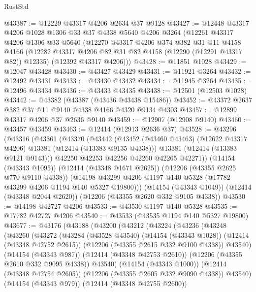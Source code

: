 \begin{lexlean}{RustStd}
\begin{coremodule}
@43387 := @12229 @43317 @4206 @2634 @37 @9128
@43427 := @12448
    @43317
    @4206
    @1028
    @1306
    @33
    @37
    @4338
    @5640
    @4206
    @3264
    (@12261
      @43317
      @4206
      @1306
      @33
      @5640
      (@12270
        @43317
        @4206
        @374
        @382
        @31
        @11
        @4158
        @4166
        (@12282 @43317 @4206 @82 @31 @82 @4158 (@12290 (@12291 @43317 @82)) @12335)
        (@12392 @43317 @4206)))
@43428 := @11851 @1028
@43429 := @12047 @43428
@43430 := @43427 @43429
@43431 := @11921 @3264
@43432 := @12492 @43431
@43433 := @43430 @43432
@43434 := @11945 @3264
@43435 := @12496 @43434
@43436 := @43433 @43435
@43438 := @12501 (@12503 @1028)
@43442 := @43382 (@43387 (@43436 @43438 @15486))
@43452 := @43372 @2637 @382 @37 @11 @9140 @4338 @4166 @4320 @9134 @4303
@43457 := @12899 @43317 @4206 @37 @2636 @9140
@43459 := @12907 (@12908 @9140)
@43460 := @43457 @43459
@43463 := @12414 (@12913 @2636 @37)
@43528 := @43296
    (@43316
      (@43361
        (@43370
          (@43442
            (@43452 (@43460 @43463) (@12622 @43317 @4206) @13381 (@12414 (@13383 @9135 @4338)))
            @13381
            (@12414 (@13383 @9121 @9143)))
          @42250
          @42253
          @42256
          @42260
          @42265
          @42271))
      (@14154 (@43343 @1095))
      (@12414 (@43348 @1671 @2625))
      (@12206 (@43355 @2625 @770 @9110 @4338))
      (@14198 @43299 @4206 @1197 @140 @5328 (@17782 @43299 @4206 @1194 @140 @5327 @19800)))
    (@14154 (@43343 @1049))
    (@12414 (@43348 @2044 @2620))
    (@12206 (@43355 @2620 @332 @9105 @4338))
@43530 := @14198 @42727 @4206
@43533 := @43530 @1197 @140 @5328
@43535 := @17782 @42727 @4206
@43540 := @43533 (@43535 @1194 @140 @5327 @19800)
@43677 := @43176
    (@43188
      (@43200
        (@43212
          (@43224
            (@43236
              (@43248
                (@43260
                  (@43272
                    (@43284
                      (@43528 @43540)
                      (@14154 (@43343 @1028))
                      (@12414 (@43348 @42752 @2615))
                      (@12206 (@43355 @2615 @332 @9100 @4338))
                      @43540)
                    (@14154 (@43343 @987))
                    (@12414 (@43348 @42753 @2610))
                    (@12206 (@43355 @2610 @332 @9095 @4338))
                    @43540)
                  (@14154 (@43343 @1000))
                  (@12414 (@43348 @42754 @2605))
                  (@12206 (@43355 @2605 @332 @9090 @4338))
                  @43540)
                (@14154 (@43343 @979))
                (@12414 (@43348 @42755 @2600))

\end{coremodule}
\end{lexlean}
